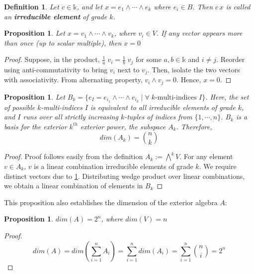 \documentclass[12pt]{article}
\newtheorem{proposition}[theorem]{Proposition}
\newtheorem{definition}[theorem]{Definition}
\numberwithin{theorem}{section}
\numberwithin{equation}{theorem}
\newcommand{\kk}{\mathds{k}}
\begin{document}
\begin{definition} 
Let $c \in \kk$, and let $x = e_1 \wedge \cdots \wedge e_k$ where $e_i \in B$. Then $c\,x$ is called an \textbf{irreducible element} of grade $k$.
\end{definition}

\begin{proposition}\label{prop:nil}
    Let $x = v_1 \wedge \cdots \wedge v_k$, where $v_i \in V$. If any vector appears more than once (up to scalar multiple), then $x = 0$
\end{proposition}
\begin{proof}
    Suppose, in the product, $\frac{1}{a}\;v_i = \frac{1}{b}\;v_j$ for some $a, b \in \kk$ and $i \neq j$. Reorder using anti-commutativity to bring $v_i$ next to $v_j$. Then, isolate the two vectors with associativity. From alternating property, $v_i \wedge v_j = 0$. Hence, $x = 0$.
\end{proof}

\begin{proposition}\label{prop:basis}
    Let $B_k = \{e_I = e_{i_1} \wedge \cdots \wedge e_{i_k} \mid \forall \;k\text{-multi-indices } I\}$. Here, the set of possible $k$-multi-indices $I$ is equivalent to all irreducible elements of grade $k$, and $I$ runs over all strictly increasing $k$-tuples of indices from $\{1, \cdots, n\}$.
    $B_k$ is a basis for the exterior $k^{th}$ exterior power, the subspace $A_k$. Therefore, $$dim(A_k) = \binom{n}{k}$$ 
\end{proposition}
\begin{proof}
    Proof follows easily from the definition $A_k := \bigwedge^kV$. For any element $v \in A_k$, $v$ is a linear combination irreducible elements of grade $k$. We require distinct vectors due to \ref{prop:nil}. Distributing wedge product over linear combinations, we obtain a linear combination of elements in $B_k$
\end{proof}
This proposition also establishes the dimension of the exterior algebra $A$:
\begin{proposition}
    $dim(A) = 2^n$, where $dim(V) = n$ 
\end{proposition}
\begin{proof}
    $$dim(A) = dim\left(\sum_{i=1}^nA_i\right) = \sum_{i=1}^n dim(A_i) = \sum_{i=1}^n \binom{n}{i} = 2^n$$
\end{proof}
\end{document}
